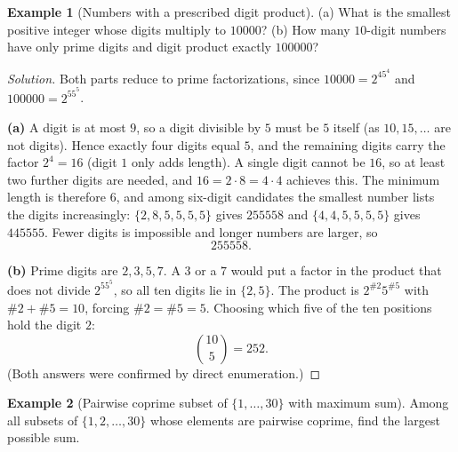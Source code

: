 \documentclass[11pt]{article}
\theoremstyle{definition}
\newtheorem{example}{Example}[section]
\begin{document}
\begin{example}[Numbers with a prescribed digit product]
(a) What is the smallest positive integer whose digits multiply to $10000$? (b) How many $10$-digit numbers have only prime digits and digit product exactly $100000$?
\end{example}

\begin{proof}[Solution]
Both parts reduce to prime factorizations, since $10000=2^45^4$ and $100000=2^55^5$.

\textbf{(a)} A digit is at most $9$, so a digit divisible by $5$ must be $5$ itself (as $10,15,\dots$ are not digits). Hence exactly four digits equal $5$, and the remaining digits carry the factor $2^4=16$ (digit $1$ only adds length). A single digit cannot be $16$, so at least two further digits are needed, and $16=2\cdot 8=4\cdot 4$ achieves this. The minimum length is therefore $6$, and among six-digit candidates the smallest number lists the digits increasingly: $\{2,8,5,5,5,5\}$ gives $255558$ and $\{4,4,5,5,5,5\}$ gives $445555$. Fewer digits is impossible and longer numbers are larger, so
\[
\boxed{255558}.
\]

\textbf{(b)} Prime digits are $2,3,5,7$. A $3$ or a $7$ would put a factor in the product that does not divide $2^55^5$, so all ten digits lie in $\{2,5\}$. The product is $2^{\#2}5^{\#5}$ with $\#2+\#5=10$, forcing $\#2=\#5=5$. Choosing which five of the ten positions hold the digit $2$:
\[
\boxed{\binom{10}{5}=252}.
\]
(Both answers were confirmed by direct enumeration.)
\end{proof}

\begin{example}[Pairwise coprime subset of $\{1,\dots,30\}$ with maximum sum]
Among all subsets of $\{1,2,\dots,30\}$ whose elements are pairwise coprime, find the largest possible sum.
\end{example}
\end{document}
